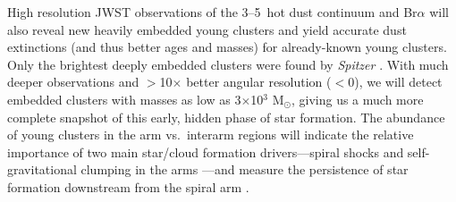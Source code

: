\documentclass[12pt]{article}
\begin{document}


High resolution JWST observations of the 3--5\micron\ hot dust continuum and Br$\alpha$ will also reveal new heavily embedded young clusters and yield accurate dust extinctions (and thus better ages and masses) for already-known young clusters. Only the brightest deeply embedded clusters were found by {\em Spitzer} \citep[][]{elmegreen2014}. With much deeper observations and $>$10$\times$ better angular resolution ($<$0), we will detect embedded clusters with masses as low as 3$\times$10$^3$ M$_{\odot}$, giving us a much more complete snapshot of this early, hidden phase of star formation. The abundance of young clusters in the arm vs.\ interarm regions will indicate the relative importance of two main star/cloud formation drivers---spiral shocks and self-gravitational clumping in the arms \citep{kim2002}---and measure the persistence of star formation downstream from the spiral arm \citep{koda2009}. 

\end{document}
